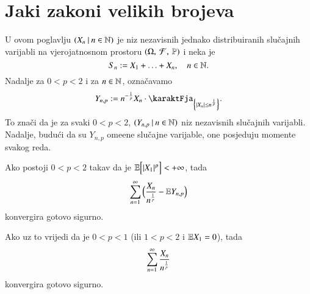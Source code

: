 
\chapter{Jaki zakoni velikih brojeva}

U ovom poglavlju $({X_n} \: | \: {n \in \mathbb{N}})$ je niz nezavisnih jednako distribuiranih slu\v cajnih varijabli na vjerojatnosnom prostoru $(\Omega, \: \mathcal{F}, \: \mathbb{P})$ i neka je
\begin{equation*}
    S_n := X_1 + \ldots + X_n, \quad n \in \mathbb{N}.
\end{equation*}
Nadalje za $0 < p < 2$ i za $n \in \mathbb{N}$, ozna\v cavamo
\begin{equation*}
    Y_{n, p} := n^{-\frac{1}{p}} X_n \cdot \karaktFja_{\Big\{|X_n| \leq n^\frac{1}{p} \Big\}}.
\end{equation*}
To zna\v ci da je za svaki $0 < p < 2$, $({Y_{n, p}} \: | \: {n \in \mathbb{N}})$ niz nezavisnih slu\v cajnih varijabli.
Nadalje, budu\' ci da su $Y_{n, p}$ ome\dj ene slu\v cajne varijable, one posjeduju momente svakog reda.

\begin{tm}  \label{tm:14.1}
    Ako postoji $0 < p < 2$ takav da je $\mathbb{E} \Big[ |X_1|^p \Big] < +\infty$, tada
    \begin{equation*}
        \sum\limits_{n = 1}^{\infty} \Big( \frac{X_n}{n^\frac{1}{p}} - \mathbb{E} Y_{n, p} \Big)
    \end{equation*}
    konvergira gotovo sigurno.
    
    Ako uz to vrijedi da je $0 < p < 1$ (ili $1 < p <2$ i $\mathbb{E} X_1 = 0$), tada
    \begin{equation*}
        \sum\limits_{n = 1}^{\infty} \frac{X_n}{n^\frac{1}{p}}
    \end{equation*}
    konvergira gotovo sigurno.
\end{tm}

